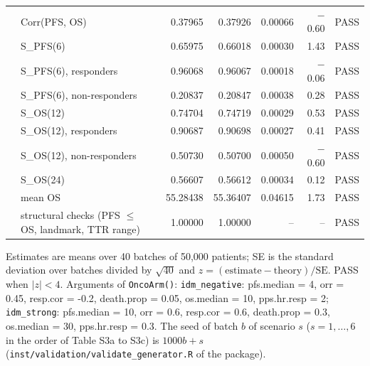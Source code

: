 \begin{table}[htbp]
\begin{threeparttable}
\begin{tabular}{p{2.4cm}p{4.2cm}rrrrl}
 & Corr(PFS, OS) & 0.37965 & 0.37926 & 0.00066 & $-$0.60 & PASS \\
 & S\_PFS(6) & 0.65975 & 0.66018 & 0.00030 & 1.43 & PASS \\
 & S\_PFS(6), responders & 0.96068 & 0.96067 & 0.00018 & $-$0.06 & PASS \\
 & S\_PFS(6), non-responders & 0.20837 & 0.20847 & 0.00038 & 0.28 & PASS \\
 & S\_OS(12) & 0.74704 & 0.74719 & 0.00029 & 0.53 & PASS \\
 & S\_OS(12), responders & 0.90687 & 0.90698 & 0.00027 & 0.41 & PASS \\
 & S\_OS(12), non-responders & 0.50730 & 0.50700 & 0.00050 & $-$0.60 & PASS \\
 & S\_OS(24) & 0.56607 & 0.56612 & 0.00034 & 0.12 & PASS \\
 & mean OS & 55.28438 & 55.36407 & 0.04615 & 1.73 & PASS \\
 & structural checks (PFS $\le$ OS, landmark, TTR range) & 1.00000 & 1.00000 & -- & -- & PASS \\
\bottomrule
\end{tabular}
\begin{tablenotes}
\footnotesize
\item Estimates are means over 40 batches of 50,000 patients; SE is the standard deviation over batches divided by $\sqrt{40}$ and $z = (\mathrm{estimate} - \mathrm{theory}) / \mathrm{SE}$. PASS when $|z| < 4$. Arguments of \texttt{OncoArm()}: \texttt{idm\_negative}: pfs.median = 4, orr = 0.45, resp.cor = -0.2, death.prop = 0.05, os.median = 10, pps.hr.resp = 2; \texttt{idm\_strong}: pfs.median = 10, orr = 0.6, resp.cor = 0.6, death.prop = 0.3, os.median = 30, pps.hr.resp = 0.3. The seed of batch $b$ of scenario $s$ ($s = 1, \ldots, 6$ in the order of Table S3a to S3c) is $1000 b + s$ (\texttt{inst/validation/validate\_generator.R} of the package).
\end{tablenotes}
\end{threeparttable}
\end{table}
